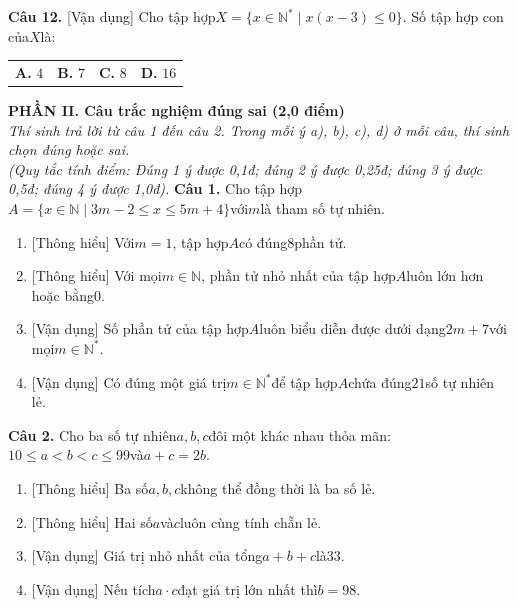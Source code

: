 \documentclass[11pt,a4paper]{article}
\begin{document}
\noindent\textbf{Câu 12.} [Vận dụng] Cho tập hợp$X = \{x \in \mathbb{N}^* \mid x(x - 3) \le 0\}$. Số tập hợp con của$X$là:\par\vspace{2pt}
\noindent\begin{tabular*}{\textwidth}{@{\extracolsep{\fill}}llll@{}}
\textbf{A.} $4$ & \textbf{B.} $7$ & \textbf{C.} $8$ & \textbf{D.} $16$
\end{tabular*}\par\vspace{5pt}


\vspace{6pt}
\noindent
\textbf{\large PHẦN II. Câu trắc nghiệm đúng sai (2,0 điểm)}\\
\textit{\small Thí sinh trả lời từ câu 1 đến câu 2. Trong mỗi ý a), b), c), d) ở mỗi câu, thí sinh chọn đúng hoặc sai.}\\
\textit{\small (Quy tắc tính điểm: Đúng 1 ý được 0,1đ; đúng 2 ý được 0,25đ; đúng 3 ý được 0,5đ; đúng 4 ý được 1,0đ).}
\vspace{6pt}
\noindent\textbf{Câu 1.} Cho tập hợp$A = \{x \in \mathbb{N} \mid 3m - 2 \le x \le 5m + 4\}$với$m$là tham số tự nhiên.\par\vspace{2pt}
\begin{enumerate}[label=\textbf{\alph*)}, leftmargin=1.2cm, itemsep=2pt, topsep=2pt]
  \item \textnormal{[Thông hiểu]} Với$m = 1$, tập hợp$A$có đúng$8$phần tử.
  \item \textnormal{[Thông hiểu]} Với mọi$m \in \mathbb{N}$, phần tử nhỏ nhất của tập hợp$A$luôn lớn hơn hoặc bằng$0$.
  \item \textnormal{[Vận dụng]} Số phần tử của tập hợp$A$luôn biểu diễn được dưới dạng$2m + 7$với mọi$m \in \mathbb{N}^*$.
  \item \textnormal{[Vận dụng]} Có đúng một giá trị$m \in \mathbb{N}^*$để tập hợp$A$chứa đúng$21$số tự nhiên lẻ.
\end{enumerate}
\vspace{6pt}

\noindent\textbf{Câu 2.} Cho ba số tự nhiên$a, b, c$đôi một khác nhau thỏa mãn:$10 \le a < b < c \le 99$và$a + c = 2b$.\par\vspace{2pt}
\begin{enumerate}[label=\textbf{\alph*)}, leftmargin=1.2cm, itemsep=2pt, topsep=2pt]
  \item \textnormal{[Thông hiểu]} Ba số$a, b, c$không thể đồng thời là ba số lẻ.
  \item \textnormal{[Thông hiểu]} Hai số$a$và$c$luôn cùng tính chẵn lẻ.
  \item \textnormal{[Vận dụng]} Giá trị nhỏ nhất của tổng$a + b + c$là$33$.
  \item \textnormal{[Vận dụng]} Nếu tích$a \cdot c$đạt giá trị lớn nhất thì$b = 98$.
\end{enumerate}
\vspace{6pt}
\end{document}
